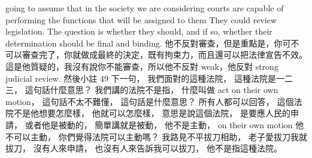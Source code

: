 \hypertarget{w06:cue:1605}{}going to assume that
\hypertarget{w06:cue:1606}{}in the society we are considering
\hypertarget{w06:cue:1607}{}courts are capable of performing the functions
\hypertarget{w06:cue:1608}{}that will be assigned to them
\hypertarget{w06:cue:1609}{}They could review legislation. The question is whether they should, and if so, whether their determination should be final and binding.
\hypertarget{w06:cue:1610}{}他不反對審查，但是重點是，你可不可以審查完了，你就做成最終的決定，既有拘束力，而且還可以把法律宣告不效。
\hypertarget{w06:cue:1611}{}這是他質疑的，我沒有說你不能審查，所以他不反對 weak，他反對 strong judicial review.
\hypertarget{w06:cue:1612}{}然後小註 49 下一句，
\hypertarget{w06:cue:1613}{}我們面對的這種法院，
\hypertarget{w06:cue:1614}{}這種法院是一二三，
\hypertarget{w06:cue:1615}{}這句話什麼意思？
\hypertarget{w06:cue:1616}{}我們講的法院不是指，
\hypertarget{w06:cue:1617}{}什麼叫做 act on their own motion，
\hypertarget{w06:cue:1618}{}這句話不太不難懂，
\hypertarget{w06:cue:1619}{}這句話是什麼意思？
\hypertarget{w06:cue:1620}{}所有人都可以回答，
\hypertarget{w06:cue:1621}{}這個法院不是他想要怎麼樣，
\hypertarget{w06:cue:1622}{}他就可以怎麼樣，
\hypertarget{w06:cue:1623}{}意思是說這個法院，
\hypertarget{w06:cue:1624}{}是要應人民的申請，
\hypertarget{w06:cue:1625}{}或者他是被動的，
\hypertarget{w06:cue:1626}{}簡單講就是被動，
\hypertarget{w06:cue:1627}{}他不是主動，
\hypertarget{w06:cue:1628}{}on their own motion
\hypertarget{w06:cue:1629}{}他不可以主動，
\hypertarget{w06:cue:1630}{}你們覺得法院可以主動嗎？
\hypertarget{w06:cue:1631}{}我路見不平拔刀相助，
\hypertarget{w06:cue:1632}{}老子愛拔刀我就拔刀，
\hypertarget{w06:cue:1633}{}沒有人來申請，
\hypertarget{w06:cue:1634}{}也沒有人來告訴我可以拔刀，
\hypertarget{w06:cue:1635}{}他不是指這種法院。


